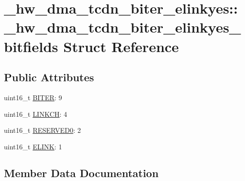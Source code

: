 \hypertarget{struct__hw__dma__tcdn__biter__elinkyes_1_1__hw__dma__tcdn__biter__elinkyes__bitfields}{}\section{\+\_\+hw\+\_\+dma\+\_\+tcdn\+\_\+biter\+\_\+elinkyes\+:\+:\+\_\+hw\+\_\+dma\+\_\+tcdn\+\_\+biter\+\_\+elinkyes\+\_\+bitfields Struct Reference}
\label{struct__hw__dma__tcdn__biter__elinkyes_1_1__hw__dma__tcdn__biter__elinkyes__bitfields}
\subsection*{Public Attributes}
\begin{DoxyCompactItemize}
\item 
uint16\+\_\+t \hyperlink{struct__hw__dma__tcdn__biter__elinkyes_1_1__hw__dma__tcdn__biter__elinkyes__bitfields_a9a419b5d1e825a2c3cda2ed5a51113c0}{B\+I\+T\+ER}\+: 9
\item 
uint16\+\_\+t \hyperlink{struct__hw__dma__tcdn__biter__elinkyes_1_1__hw__dma__tcdn__biter__elinkyes__bitfields_a1466c73ea2b23709fd51ee74d9fbd5e5}{L\+I\+N\+K\+CH}\+: 4
\item 
uint16\+\_\+t \hyperlink{struct__hw__dma__tcdn__biter__elinkyes_1_1__hw__dma__tcdn__biter__elinkyes__bitfields_aaa52ced66b163d5d46b95bb9c5947359}{R\+E\+S\+E\+R\+V\+E\+D0}\+: 2
\item 
uint16\+\_\+t \hyperlink{struct__hw__dma__tcdn__biter__elinkyes_1_1__hw__dma__tcdn__biter__elinkyes__bitfields_a9fcddfe89dc30d2675464f9410241338}{E\+L\+I\+NK}\+: 1
\end{DoxyCompactItemize}


\subsection{Member Data Documentation}
